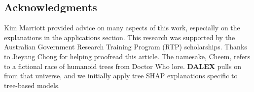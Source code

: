 \documentclass[
]{jss}
\begin{document}
\hypertarget{acknowledgments}{%
\subsection*{Acknowledgments}\label{acknowledgments}}

Kim Marriott provided advice on many aspects of this work, especially on
the explanations in the applications section. This research was
supported by the Australian Government Research Training Program (RTP)
scholarships. Thanks to Jieyang Chong for helping proofread this
article. The namesake, Cheem, refers to a fictional race of humanoid
trees from Doctor Who lore. \textbf{DALEX} pulls on from that universe,
and we initially apply tree SHAP explanations specific to tree-based
models.

\renewcommand\refname{References}

\end{document}
